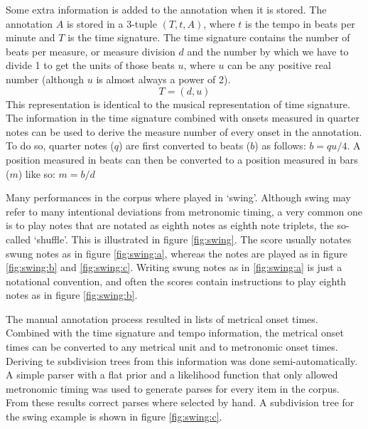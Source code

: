 Some extra information is added to the annotation when it is stored. The annotation $A$ is stored in a 3-tuple $(T, t, A)$, where $t$ is the tempo in beats per minute and $T$ is the time signature. The time signature contains the number of beats per measure, or measure division $d$ and the number by which we have to divide 1 to get the units of those beats $u$, where $u$ can be any positive real number (although $u$ is almost always a power of 2). 
\begin{equation*}
T = (d, u)
\end{equation*}
This representation is identical to the musical representation of time signature. The information in the time signature combined with onsets measured in quarter notes can be used to derive the measure number of every onset in the annotation. To do so, quarter notes ($q$) are first converted to beats ($b$) as follows: $b = qu/4$. A position measured in beats can then be converted to a position measured in bars ($m$) like so: $m = b/d$

Many performances in the corpus where played in `swing'. Although swing may refer to many intentional deviations from metronomic timing, a very common one is to play notes that are notated as eighth notes as eighth note triplets, the so-called `shuffle'. This is illustrated in figure \ref{fig:swing}. The score usually notates swung notes as in figure \ref{fig:swing:a}, whereas the notes are played as in figure \ref{fig:swing:b} and \ref{fig:swing:c}. Writing swung notes as in \ref{fig:swing:a} is just a notational convention, and often the scores contain instructions to play eighth notes as in figure \ref{fig:swing:b}.

The manual annotation process resulted in lists of metrical onset times. Combined with the time signature and tempo information, the metrical onset times can be converted to any metrical unit and to metronomic onset times. Deriving te subdivision trees from this information was done semi-automatically. A simple parser with a flat prior and a likelihood function that only allowed metronomic timing was used to generate parses for every item in the corpus. From these results correct parses where selected by hand. A subdivision tree for the swing example is shown in figure \ref{fig:swing:c}. 


